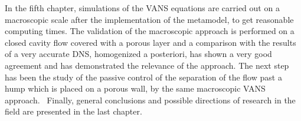 In the fifth chapter, simulations of the VANS equations are carried out on a macroscopic scale after the implementation of the metamodel, to get reasonable computing times. The validation of the macroscopic approach is performed on a closed cavity flow covered with a porous layer and a comparison with the results of a very accurate DNS, homogenized a posteriori, has shown a very good agreement and has demonstrated the relevance of the approach. The next step has been the study of the passive control of the separation of the flow past a hump which is placed on a  porous wall, by the same macroscopic VANS approach.  Finally, general conclusions and possible directions of research in the field are presented in the last chapter.
